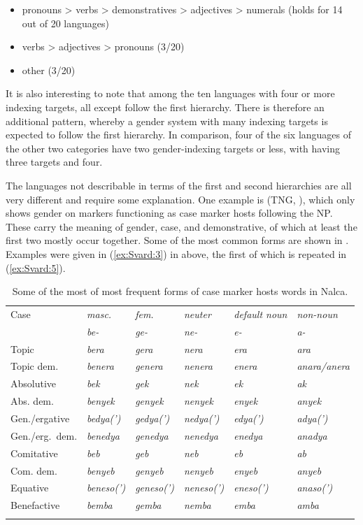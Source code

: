 \documentclass[output=collectionpaper]{langsci/langscibook}
\begin{document}
\begin{itemize}
\item pronouns > verbs > demonstratives > adjectives > numerals (holds for 14 out of 20 languages)
\item verbs > adjectives > pronouns (3/20)
\item other (3/20)
\end{itemize}

It is also interesting to note that among the ten languages with four or more indexing targets, all except  follow the first hierarchy. There is therefore an additional pattern, whereby a gender system with many indexing targets is expected to follow the first hierarchy. In comparison, four of the six languages of the other two categories have two gender-indexing targets or less, with  having three targets and  four.


The languages not describable in terms of the first and second hierarchies are all very different and require some explanation. One example is  (TNG, ), which only shows gender on markers functioning as case marker hosts following the NP. These carry the meaning of gender, case, and demonstrative, of which at least the first two mostly occur together. Some of the most common forms are shown in . Examples were given in (\ref{ex:Svard:3}) in  above, the first of which is repeated in (\ref{ex:Svard:5}).


\begin{table}
\begin{tabularx}{\textwidth}{X>{\itshape}l>{\itshape}l>{\itshape}l>{\itshape}l>{\itshape}l}
\lsptoprule

Case & \normalfont masc. & \normalfont fem. & \normalfont neuter  & \normalfont default noun  & \normalfont non-noun \\
 & be- & ge- & ne- & e- & a- \\
\midrule
Topic & bera & gera & nera & era & ara\\
Topic dem. & benera & genera & nenera & enera & anara/anera\\
Absolutive & bek & gek & nek & ek & ak\\
Abs. dem. & benyek & genyek & nenyek & enyek & anyek\\
Gen./ergative & bedya(') & gedya(') & nedya(') & edya(') & adya(')\\
Gen./erg.~dem. & benedya & genedya & nenedya & enedya & anadya\\
Comitative & beb & geb & neb & eb & ab\\
Com. dem. & benyeb & genyeb & nenyeb & enyeb & anyeb\\
Equative & beneso(') & geneso(') & neneso(') & eneso(') & anaso(')\\
Benefactive & bemba & gemba & nemba & emba & amba\\
\lspbottomrule
\end{tabularx}
\caption{Some of the most of most frequent forms of case marker hosts words in Nalca.}
\label{tab:Svard:9}
\end{table}
\end{document}
